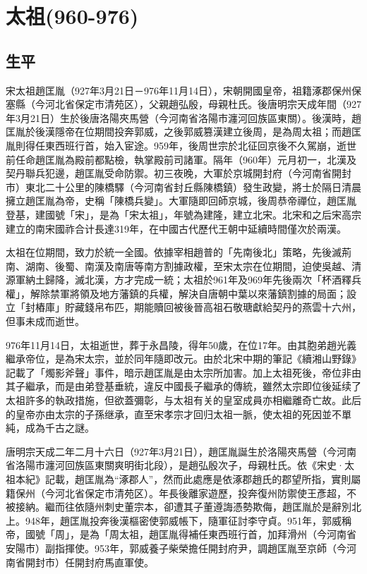 
\section{太祖\tiny(960-976)}

\subsection{生平}

宋太祖趙匡胤（927年3月21日－976年11月14日），宋朝開國皇帝，祖籍涿郡保州保塞縣（今河北省保定市清苑区），父親趙弘殷，母親杜氏。後唐明宗天成年間（927年3月21日）生於後唐洛陽夾馬營（今河南省洛陽市瀍河回族區東關）。後漢時，趙匡胤於後漢隱帝在位期間投奔郭威，之後郭威篡漢建立後周，是為周太祖；而趙匡胤則得任東西班行首，始入宦途。959年，後周世宗於北征回京後不久駕崩，逝世前任命趙匡胤為殿前都點檢，執掌殿前司諸軍。隔年（960年）元月初一，北漢及契丹聯兵犯邊，趙匡胤受命防禦。初三夜晚，大軍於京城開封府（今河南省開封市）東北二十公里的陳橋驛（今河南省封丘縣陳橋鎮）發生政變，將士於隔日清晨擁立趙匡胤為帝，史稱「陳橋兵變」。大軍隨即回師京城，後周恭帝禪位，趙匡胤登基，建國號「宋」，是為「宋太祖」，年號為建隆，建立北宋。北宋和之后宋高宗建立的南宋國祚合计長達319年，在中國古代歷代王朝中延續時間僅次於兩漢。

太祖在位期間，致力於統一全國。依據宰相趙普的「先南後北」策略，先後滅荊南、湖南、後蜀、南漢及南唐等南方割據政權，至宋太宗在位期間，迫使吳越、清源軍納土歸降，滅北漢，方才完成一統；太祖於961年及969年先後兩次「杯酒釋兵權」，解除禁軍將領及地方藩鎮的兵權，解決自唐朝中葉以來藩鎮割據的局面；設立「封樁庫」貯藏錢帛布匹，期能贖回被後晉高祖石敬瑭獻給契丹的燕雲十六州，但事未成而逝世。

976年11月14日，太祖逝世，葬于永昌陵，得年50歲，在位17年。由其胞弟趙光義繼承帝位，是為宋太宗，並於同年隨即改元。由於北宋中期的筆記《續湘山野錄》記載了「燭影斧聲」事件，暗示趙匡胤是由太宗所加害。加上太祖死後，帝位非由其子繼承，而是由弟登基垂統，違反中國長子繼承的傳統，雖然太宗即位後延续了太祖許多的執政措施，但欲蓋彌彰，与太祖有关的皇室成員亦相繼離奇亡故。此后的皇帝亦由太宗的子孫继承，直至宋孝宗才回归太祖一脈，使太祖的死因並不單純，成為千古之謎。

唐明宗天成二年二月十六日（927年3月21日），趙匡胤誕生於洛陽夾馬營（今河南省洛陽市瀍河回族區東關爽明街北段），是趙弘殷次子，母親杜氏。依《宋史·太祖本紀》記載，趙匡胤為“涿郡人”，然而此處應是依涿郡趙氏的郡望所指，實則屬籍保州（今河北省保定市清苑区）。年長後離家遊歷，投奔復州防禦使王彥超，不被接納。繼而往依隨州刺史董宗本，卻遭其子董遵誨憑勢欺侮，趙匡胤於是辭別北上。948年，趙匡胤投奔後漢樞密使郭威帳下，隨軍征討李守貞。951年，郭威稱帝，國號「周」，是為「周太祖，趙匡胤得補任東西班行首，加拜滑州（今河南省安陽市）副指揮使。953年，郭威養子柴榮擔任開封府尹，調趙匡胤至京師（今河南省開封市）任開封府馬直軍使。


